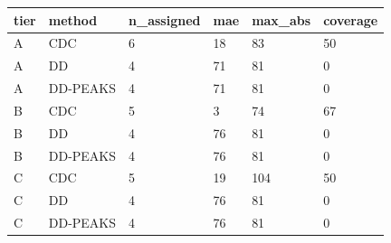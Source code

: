 \begin{tabular}{llllll}
\toprule
tier & method & n_assigned & mae & max_abs & coverage \\
\midrule
A & CDC & 6 & 18 & 83 & 50 \\
A & DD & 4 & 71 & 81 & 0 \\
A & DD-PEAKS & 4 & 71 & 81 & 0 \\
B & CDC & 5 & 3 & 74 & 67 \\
B & DD & 4 & 76 & 81 & 0 \\
B & DD-PEAKS & 4 & 76 & 81 & 0 \\
C & CDC & 5 & 19 & 104 & 50 \\
C & DD & 4 & 76 & 81 & 0 \\
C & DD-PEAKS & 4 & 76 & 81 & 0 \\
\bottomrule
\end{tabular}
